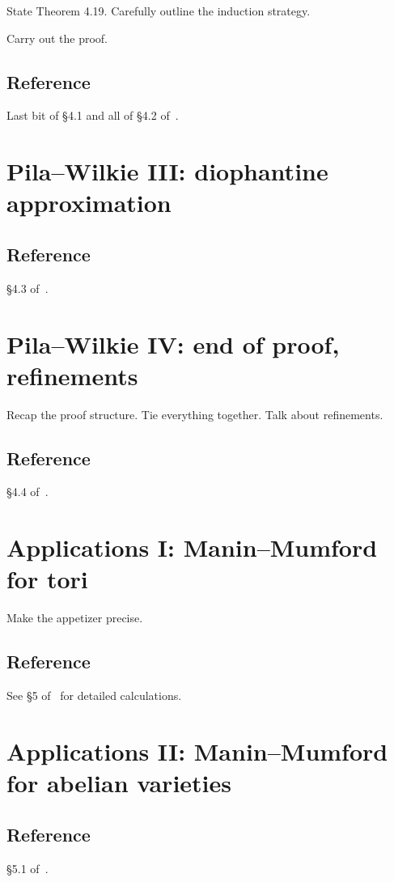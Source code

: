\documentclass[10pt, a4paper]{amsart}
\begin{document}
State Theorem 4.19. Carefully outline the induction strategy.

Carry out the proof.

\subsection*{Reference} Last bit of \S4.1 and all of \S4.2 of~\cite{scanlon}.

\section{Pila--Wilkie III: diophantine approximation}

\subsection*{Reference} \S4.3 of~\cite{scanlon}.

\section{Pila--Wilkie IV: end of proof, refinements}

Recap the proof structure.
Tie everything together.
Talk about refinements.

\subsection*{Reference} \S4.4 of~\cite{scanlon}.

\section{Applications I: Manin--Mumford for tori}

Make the appetizer precise.

\subsection*{Reference}
See \S5 of~\cite{csp} for detailed calculations.

\section{Applications II: Manin--Mumford for abelian varieties}

\subsection*{Reference} \S5.1 of~\cite{scanlon}.

\printbibliography
\end{document}
